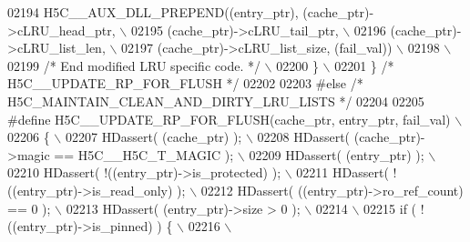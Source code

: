 \begin{DoxyCode}
02194 \textcolor{preprocessor}{        H5C\_\_AUX\_DLL\_PREPEND((entry\_ptr), (cache\_ptr)->cLRU\_head\_ptr,       \(\backslash\)}
02195 \textcolor{preprocessor}{                             (cache\_ptr)->cLRU\_tail\_ptr,                    \(\backslash\)}
02196 \textcolor{preprocessor}{                             (cache\_ptr)->cLRU\_list\_len,                    \(\backslash\)}
02197 \textcolor{preprocessor}{                             (cache\_ptr)->cLRU\_list\_size, (fail\_val))       \(\backslash\)}
02198 \textcolor{preprocessor}{                                                                            \(\backslash\)}
02199 \textcolor{preprocessor}{        }\textcolor{comment}{/* End modified LRU specific code. */}\textcolor{preprocessor}{                               \(\backslash\)}
02200 \textcolor{preprocessor}{    \}                                                                       \(\backslash\)}
02201 \textcolor{preprocessor}{\} }\textcolor{comment}{/* H5C\_\_UPDATE\_RP\_FOR\_FLUSH */}\textcolor{preprocessor}{}
02202 
02203 \textcolor{preprocessor}{#else }\textcolor{comment}{/* H5C\_MAINTAIN\_CLEAN\_AND\_DIRTY\_LRU\_LISTS */}\textcolor{preprocessor}{}
02204 
02205 \textcolor{preprocessor}{#define H5C\_\_UPDATE\_RP\_FOR\_FLUSH(cache\_ptr, entry\_ptr, fail\_val)            \(\backslash\)}
02206 \textcolor{preprocessor}{\{                                                                           \(\backslash\)}
02207 \textcolor{preprocessor}{    HDassert( (cache\_ptr) );                                                \(\backslash\)}
02208 \textcolor{preprocessor}{    HDassert( (cache\_ptr)->magic == H5C\_\_H5C\_T\_MAGIC );                     \(\backslash\)}
02209 \textcolor{preprocessor}{    HDassert( (entry\_ptr) );                                                \(\backslash\)}
02210 \textcolor{preprocessor}{    HDassert( !((entry\_ptr)->is\_protected) );                               \(\backslash\)}
02211 \textcolor{preprocessor}{    HDassert( !((entry\_ptr)->is\_read\_only) );                               \(\backslash\)}
02212 \textcolor{preprocessor}{    HDassert( ((entry\_ptr)->ro\_ref\_count) == 0 );                           \(\backslash\)}
02213 \textcolor{preprocessor}{    HDassert( (entry\_ptr)->size > 0 );                                      \(\backslash\)}
02214 \textcolor{preprocessor}{                                                                            \(\backslash\)}
02215 \textcolor{preprocessor}{    if ( ! ((entry\_ptr)->is\_pinned) ) \{                                     \(\backslash\)}
02216 \textcolor{preprocessor}{                                                                            \(\backslash\)}

\end{DoxyCode}
